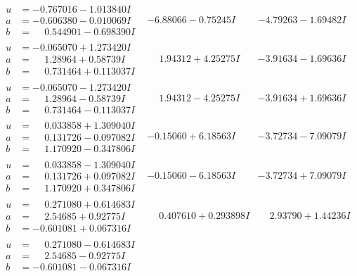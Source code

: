 \documentclass[1p]{elsarticle_modified}
\theoremstyle{definition}
\begin{document}
$$\begin{array}{c|c|c}
\begin{aligned}
u &= -0.767016 - 1.013840 I \\
a &= -0.606380 - 0.010069 I \\
b &= \phantom{-}0.544901 - 0.698390 I\end{aligned}
 & -6.88066 - 0.75245 I & -4.79263 - 1.69482 I \\ \hline\begin{aligned}
u &= -0.065070 + 1.273420 I \\
a &= \phantom{-}1.28964 + 0.58739 I \\
b &= \phantom{-}0.731464 + 0.113037 I\end{aligned}
 & \phantom{-}1.94312 + 4.25275 I & -3.91634 - 1.69636 I \\ \hline\begin{aligned}
u &= -0.065070 - 1.273420 I \\
a &= \phantom{-}1.28964 - 0.58739 I \\
b &= \phantom{-}0.731464 - 0.113037 I\end{aligned}
 & \phantom{-}1.94312 - 4.25275 I & -3.91634 + 1.69636 I \\ \hline\begin{aligned}
u &= \phantom{-}0.033858 + 1.309040 I \\
a &= \phantom{-}0.131726 - 0.097082 I \\
b &= \phantom{-}1.170920 - 0.347806 I\end{aligned}
 & -0.15060 + 6.18563 I & -3.72734 - 7.09079 I \\ \hline\begin{aligned}
u &= \phantom{-}0.033858 - 1.309040 I \\
a &= \phantom{-}0.131726 + 0.097082 I \\
b &= \phantom{-}1.170920 + 0.347806 I\end{aligned}
 & -0.15060 - 6.18563 I & -3.72734 + 7.09079 I \\ \hline\begin{aligned}
u &= \phantom{-}0.271080 + 0.614683 I \\
a &= \phantom{-}2.54685 + 0.92775 I \\
b &= -0.601081 + 0.067316 I\end{aligned}
 & \phantom{-}0.407610 + 0.293898 I & \phantom{-}2.93790 + 1.44236 I \\ \hline\begin{aligned}
u &= \phantom{-}0.271080 - 0.614683 I \\
a &= \phantom{-}2.54685 - 0.92775 I \\
b &= -0.601081 - 0.067316 I\end{aligned}

\end{array}$$
\end{document}
